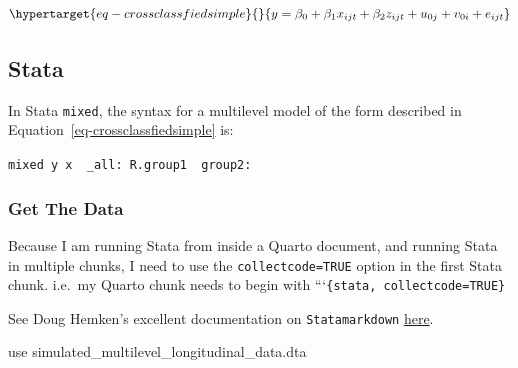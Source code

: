 \documentclass[
  letterpaper,
  DIV=11,
  numbers=noendperiod]{scrreprt}
\newenvironment{Shaded}{\begin{snugshade}}{\end{snugshade}}
\newcommand{\KeywordTok}[1]{\textcolor[rgb]{0.00,0.23,0.31}{#1}}
\newcommand{\NormalTok}[1]{\textcolor[rgb]{0.00,0.23,0.31}{#1}}
\begin{document}
\begin{equation}\protect\hypertarget{eq-crossclassfiedsimple}{}{y = \beta_0 + \beta_1 x_{ijt} + \beta_2 z_{ijt} + u_{0j} + v_{0i} + e_{ijt}}\label{eq-crossclassfiedsimple}\end{equation}

\subsection{Stata}

In Stata \texttt{mixed}, the syntax for a multilevel model of the form
described in Equation~\ref{eq-crossclassfiedsimple} is:

\texttt{mixed\ y\ x\ \textbar{}\textbar{}\ \_all:\ R.group1\ \textbar{}\textbar{}\ group2:}

\hypertarget{get-the-data-2}{%
\subsubsection{Get The Data}\label{get-the-data-2}}

\begin{tcolorbox}[enhanced jigsaw, coltitle=black, breakable, toptitle=1mm, opacityback=0, opacitybacktitle=0.6, colframe=quarto-callout-tip-color-frame, titlerule=0mm, left=2mm, leftrule=.75mm, arc=.35mm, bottomrule=.15mm, bottomtitle=1mm, colbacktitle=quarto-callout-tip-color!10!white, title=\textcolor{quarto-callout-tip-color}{\faLightbulb}\hspace{0.5em}{Tip For Running Stata From Quarto}, toprule=.15mm, rightrule=.15mm, colback=white]

Because I am running Stata from inside a Quarto document, and running
Stata in multiple chunks, I need to use the \texttt{collectcode=TRUE}
option in the first Stata chunk. i.e.~my Quarto chunk needs to begin
with ```\texttt{\{stata,\ collectcode=TRUE\}}

See Doug Hemken's excellent documentation on \texttt{Statamarkdown}
\href{https://www.ssc.wisc.edu/~hemken/Stataworkshops/Statamarkdown/linking-code-blocks.html\#linking-code-blocks-1}{here}.

\end{tcolorbox}

\begin{Shaded}
\begin{Highlighting}[]

\KeywordTok{use}\NormalTok{ simulated\_multilevel\_longitudinal\_data.dta}
\end{Highlighting}
\end{Shaded}
\end{document}

